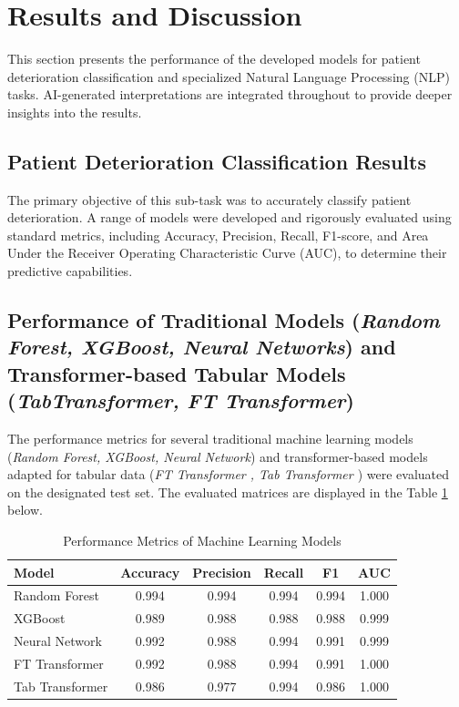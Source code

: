 \section{Results and Discussion}

This section presents the performance of the developed models for patient deterioration classification and specialized Natural Language Processing (NLP) tasks. AI-generated interpretations are integrated throughout to provide deeper insights into the results.

\subsection{Patient Deterioration Classification Results}

The primary objective of this sub-task was to accurately classify patient deterioration. A range of models were developed and rigorously evaluated using standard metrics, including Accuracy, Precision, Recall, F1-score, and Area Under the Receiver Operating Characteristic Curve (AUC), to determine their predictive capabilities.

\subsection{Performance of Traditional Models (\textit{Random Forest, XGBoost, Neural Networks}) and Transformer-based Tabular Models (\textit{TabTransformer, FT Transformer})}

The performance metrics for several traditional machine learning models (\textit{Random Forest, XGBoost, Neural Network}) and transformer-based models adapted for tabular data (\textit{FT Transformer \parencite{gorishniy2023revisitingdeeplearningmodels}, Tab Transformer \parencite{huang2020tabtransformertabulardatamodeling}}) were evaluated on the designated test set. The evaluated matrices are displayed in the Table \ref{tab:ml_model_performance}  below.

\begin{table}[htbp]
    \centering
    \caption{Performance Metrics of Machine Learning Models}
    \label{tab:ml_model_performance}
    \begin{tabular}{lccccc}
        \hline
        \textbf{Model} & \textbf{Accuracy} & \textbf{Precision} & \textbf{Recall} & \textbf{F1} & \textbf{AUC} \\
        \hline
        Random Forest & 0.994 & 0.994 & 0.994 & 0.994 & 1.000 \\
        XGBoost & 0.989 & 0.988 & 0.988 & 0.988 & 0.999 \\
        Neural Network & 0.992 & 0.988 & 0.994 & 0.991 & 0.999 \\
        FT Transformer & 0.992 & 0.988 & 0.994 & 0.991 & 1.000 \\
        Tab Transformer & 0.986 & 0.977 & 0.994 & 0.986 & 1.000 \\
        \hline
    \end{tabular}
\end{table}

